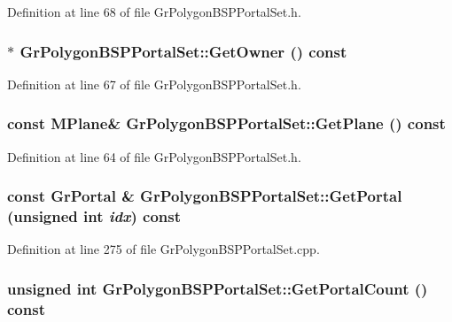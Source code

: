 Definition at line 68 of file GrPolygonBSPPortalSet.h.\hypertarget{class_gr_polygon_b_s_p_portal_set_84098f84d7dbf0ec066aaa6ad30aa1e1}{
\subsubsection[{GetOwner}]{$\ast$ GrPolygonBSPPortalSet::GetOwner () const}}
\label{class_gr_polygon_b_s_p_portal_set_84098f84d7dbf0ec066aaa6ad30aa1e1}




Definition at line 67 of file GrPolygonBSPPortalSet.h.\hypertarget{class_gr_polygon_b_s_p_portal_set_c58d0feb66fa4c5d875df0d25e7ad352}{
\subsubsection[{GetPlane}]{\setlength{\rightskip}{0pt plus 5cm}const {\bf MPlane}\& GrPolygonBSPPortalSet::GetPlane () const}}
\label{class_gr_polygon_b_s_p_portal_set_c58d0feb66fa4c5d875df0d25e7ad352}




Definition at line 64 of file GrPolygonBSPPortalSet.h.\hypertarget{class_gr_polygon_b_s_p_portal_set_e771e0ac35b02fd0f7c229121e50e561}{
\subsubsection[{GetPortal}]{\setlength{\rightskip}{0pt plus 5cm}const {\bf GrPortal} \& GrPolygonBSPPortalSet::GetPortal (unsigned int {\em idx}) const}}
\label{class_gr_polygon_b_s_p_portal_set_e771e0ac35b02fd0f7c229121e50e561}




Definition at line 275 of file GrPolygonBSPPortalSet.cpp.\hypertarget{class_gr_polygon_b_s_p_portal_set_d159b8572928f77a50b23264da9a95ac}{
\subsubsection[{GetPortalCount}]{\setlength{\rightskip}{0pt plus 5cm}unsigned int GrPolygonBSPPortalSet::GetPortalCount () const}}
\label{class_gr_polygon_b_s_p_portal_set_d159b8572928f77a50b23264da9a95ac}





